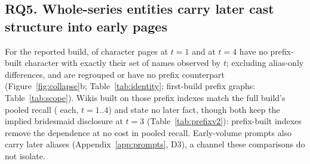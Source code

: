 \subsection{RQ5. Whole-series entities carry later cast structure into early pages}
\label{sec:results-scope}
For the reported build,  of character
pages at $t=1$ and  at $t=4$ have no prefix-built character with
exactly their set of names observed by $t$; excluding alias-only differences,
 and  are regrouped or have no prefix
counterpart (Figure~\ref{fig:collapse}b; Table~\ref{tab:identity}; first-build prefix graphs:
Table~\ref{tab:scope}). Wikis built on those
prefix indexes match the full build's pooled recall ( each,
$t=1..4$) and state no later fact, though both keep the implied bridesmaid disclosure at
$t=3$ (Table~\ref{tab:prefixv2}): prefix-built indexes remove the dependence at no cost in
pooled recall. Early-volume prompts also carry later aliases (Appendix~\ref{app:prompts},
D3), a channel these comparisons do not isolate.
